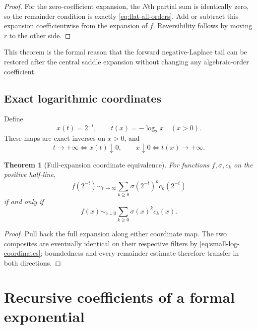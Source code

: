 \documentclass[11pt,oneside]{article}
\newtheorem{theorem}{Theorem}[section]
\theoremstyle{definition}
\theoremstyle{remark}
\begin{document}
\begin{proof}
For the zero-coefficient expansion, the $N$th partial sum is identically zero, so the
remainder condition is exactly \eqref{eq:flat-all-orders}.  Add or subtract this expansion
coefficientwise from the expansion of $f$.  Reversibility follows by moving $r$ to the other
side.
\end{proof}

This theorem is the formal reason that the forward negative-Laplace tail can be restored
after the central saddle expansion without changing any algebraic-order coefficient.

\subsection{Exact logarithmic coordinates}

Define
\begin{equation}
 x(t)=2^{-t},
 \qquad
 t(x)=-\log_2x
 \quad(x>0).
 \label{eq:small-log-coordinates}
\end{equation}
These maps are exact inverses on $x>0$, and
\begin{equation}
 t\to+\infty\iff x(t)\downarrow0,
 \qquad
 x\downarrow0\iff t(x)\to+\infty.
 \label{eq:coordinate-filter-equivalence}
\end{equation}

\begin{theorem}[Full-expansion coordinate equivalence]
\label{thm:small-log-expansion-equivalence}
For functions $f,\sigma,c_k$ on the positive half-line,
\begin{equation}
 f(2^{-t})\sim_{t\to\infty}
 \sum_{k\ge0}\sigma(2^{-t})^kc_k(2^{-t})
 \label{eq:log-coordinate-expansion}
\end{equation}
if and only if
\begin{equation}
 f(x)\sim_{x\downarrow0}
 \sum_{k\ge0}\sigma(x)^kc_k(x).
 \label{eq:small-coordinate-expansion}
\end{equation}
\end{theorem}

\begin{proof}
Pull back the full expansion along either coordinate map.  The two composites are eventually
identical on their respective filters by \eqref{eq:small-log-coordinates}; boundedness and
every remainder estimate therefore transfer in both directions.
\end{proof}

\section{Recursive coefficients of a formal exponential}
\label{sec:exp-coeff}
\end{document}
